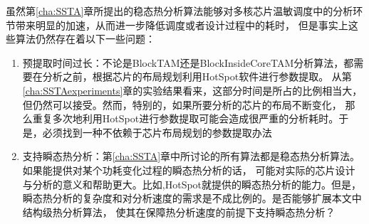 虽然第\ref{cha:SSTA}章所提出的稳态热分析算法能够对多核芯片温敏调度中的分析环节带来明显的加速，从而进一步降低调度或者设计过程中的耗时， 但是事实上这些算法仍然存在着以下一些问题：
\begin{enumerate}[1)]
\item 预提取时间过长：不论是BlockTAM还是BlockInsideCoreTAM分析算法，都需要在分析之前，根据芯片的布局规划利用HotSpot软件进行参数提取。 从第\ref{cha:SSTAexperiments}章的实验结果看来，这部分时间是所占的比例相当大，但仍然可以接受。然而，特别的，如果所要分析的芯片的布局不断变化， 那么重复多次地利用HotSpot进行参数提取可能会造成很严重的分析耗时。于是，必须找到一种不依赖于芯片布局规划的参数提取办法
\item 支持瞬态热分析：第\ref{cha:SSTA}章中所讨论的所有算法都是稳态热分析算法。如果能提供对某个功耗变化过程的瞬态热分析的话， 可能对实际的芯片设计与分析的意义和帮助更大。比如,HotSpot就提供的瞬态热分析的能力。但是， 瞬态热分析的复杂度和对分析速度的需求是不成比例的。是否能够扩展本文中结构级热分析算法， 使其在保障热分析速度的前提下支持瞬态热分析？
\end{enumerate}


